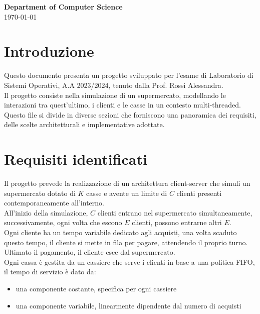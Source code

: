 \documentclass[a4paper, 12pt]{article}
\begin{document}
\begin{titlepage}
\vspace{2in}

\textbf{\large Department of Computer Science} \\

\today

\end{titlepage}

\newpage

\section{Introduzione}
Questo documento presenta un progetto sviluppato per l'esame di Laboratorio di 
Sistemi Operativi, A.A 2023/2024, tenuto dalla Prof. Rossi Alessandra.  \\
Il progetto consiste nella simulazione di un supermercato, modellando le 
interazioni tra quest'ultimo, i clienti e le casse in un contesto multi-threaded. 
Questo file si divide in diverse sezioni che forniscono una panoramica dei 
requisiti, delle scelte architetturali e implementative adottate.
\section{Requisiti identificati}
Il progetto prevede la realizzazione di un architettura client-server che simuli 
un supermercato dotato di $K$ casse e avente un limite di $C$ clienti presenti 
contemporaneamente all'interno. \\
All'inizio della simulazione, $C$ clienti entrano nel supermercato 
simultaneamente, successivamente, ogni volta che escono $E$ clienti, possono 
entrarne altri $E$. \\
Ogni cliente ha un tempo variabile dedicato agli acquisti, una volta scaduto questo
tempo, il cliente si mette in fila per pagare, attendendo il proprio turno.
Ultimato il pagamento, il cliente esce dal supermercato. \\
Ogni cassa è gestita da un cassiere che serve i clienti in base a una politica FIFO,
il tempo di servizio è dato da:
\begin{itemize}[noitemsep,topsep=0pt,parsep=0pt,partopsep=0pt]
    \item una componente costante, specifica per ogni cassiere
    \item una componente variabile, linearmente dipendente dal numero di acquisti
\end{itemize}
\end{document}
